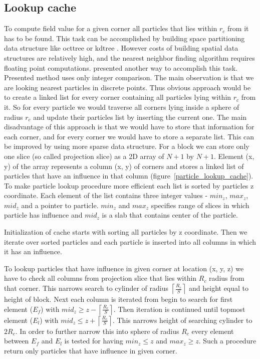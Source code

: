 \subsection{Lookup cache}\label{sec:lookupcache}
To compute field value for a given corner all particles that lies within $r_c$ from it has to be found. This task can be accomplished by building space partitioning data structure like octtree or kdtree \cite{Bentley1975}. However costs of building spatial data structures are relatively high, and the nearest neighbor finding algorithm requires floating point computations. \cite{RosenbergBirdwell2008} presented another way to accomplish this task. Presented method uses only integer comparison. The main observation is that we are looking nearest particles in discrete points. Thus obvious approach would be to create a linked list for every corner containing all particles lying within $r_c$ from it. So for every particle we would traverse all corners lying inside a sphere of radius $r_c$ and update their particles list by inserting the current one.  The main disadvantage of this approach is that we would have to store that information for each corner, and for every corner we would have to store a separate list. This can be improved by using more sparse data structure. For a block we can store only one slice (so called projection slice) as a 2D array of $N+1$ by $N+1$. Element (x, y) of the array represents a column (x, y) of corners and stores a linked list of particles that have an influence in that column (figure~\ref{particle_lookup_cache}). To make particle lookup procedure more efficient each list is sorted by particles z coordinate. Each element of the list contains three integer values - $min_z$, $max_z$, $mid_z$ and a pointer to particle. $min_z$ and $max_z$ specifies range of slices in which particle has influence and $mid_z$ is a slab that contains center of the particle. 


Initialization of cache starts with sorting all particles by z coordinate. Then we iterate over sorted particles and each particle is inserted into all columns in which it has an influence. 

To lookup particles that have influence in given corner at location (x, y, z) we have to check all columns from projection slice that lies within $R_c$ radius from that corner. This narrows search to cylinder of radius $\left \lceil \frac{R_c}{S} \right \rceil$ and height equal to height of block. Next each column is iterated from begin to search for first element ($E_f$) with $mid_z \geq z - \left \lceil \frac{R_c}{S} \right \rceil$. Then iteration is continued until topmost element ($E_l$) with $mid_z \leq  z + \left \lceil \frac{R_c}{S} \right \rceil$. This narrows height of searching cylinder to $2R_c$. In order to further narrow this into sphere of radius $R_c$  every element between $E_f$ and $E_l$ is tested for having $min_z \leq z$ and $max_z \geq z$. Such a procedure return only particles that have influence in given corner. 

